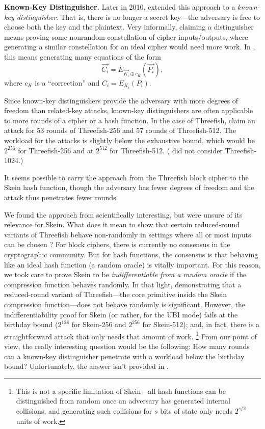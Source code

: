\documentclass[11pt,twoside]{article}
\begin{document}
\medskip

{\bf Known-Key Distinguisher.}
Later in 2010, \cite{RKN10} extended this approach to a \emph{known-key
  distinguisher}. That is, there is no longer a secret key---the adversary is free
to choose both the key and the plaintext. Very informally, claiming a 
distinguisher means proving some nonrandom constellation of cipher
inputs/outputs, where generating a similar constellation for an ideal cipher
would need more work. In \cite{RKN10}, this means 
generating many equations of the form
  \[ \vec{C_i}  =  E_{\vec{K_i}\oplus c_K}(\vec{P_i}), \]
where $c_K$ is a ``correction'' and $C_i =E_{K_i}(P_i)$. 

Since known-key distinguishers provide the adversary with more degrees of 
freedom than related-key attacks, known-key distinguishers are often 
applicable to more rounds of a cipher or a hash function. In
the case of Threefish, \cite{RKN10} claim an attack for 53 rounds of
Threefish-256 and 57 rounds of Threefish-512. The workload for the attacks
is slightly below the exhaustive bound, which would be $2^{256}$ for
Threefish-256 and at $2^{512}$ for Threefish-512. (\cite{RKN10} did not
consider Threefish-1024.)

It seems possible to carry the approach from the Threefish block cipher to the
Skein hash function, though the adversary has fewer degrees of freedom and the
attack thus penetrates fewer rounds. 

We found the approach from \cite{RKN10} scientifically interesting, but were unsure of its relevance for Skein. What does it mean to show that certain
reduced-round variants of Threefish behave non-randomly in settings where all
or most inputs can be chosen \cite{RKN10}? For block ciphers, there is
currently no consensus in the cryptographic community. But for hash functions,
the consensus is that  behaving like an ideal hash function (a random
oracle) is vitally important. For this reason, 
we took care to prove Skein to be \emph{indifferentiable from a random
  oracle} if the compression function behaves randomly. In that light,
demonstrating that a reduced-round variant of Threefish---the core primitive
inside the Skein compression function---does not behave randomly is 
significant. However, the
indifferentiability proof for Skein (or rather, for the UBI mode) fails at the
birthday bound ($2^{128}$ for Skein-256 and $2^{256}$ for Skein-512); and, in
fact, there is a straightforward attack that only needs that amount of work.%
\footnote{%
  This is not a specific limitation of Skein---all hash functions 
  can be distinguished from random once an adversary has generated internal
  collisions, and generating such collisions for $s$ bits of state only needs 
  $2^{s/2}$ units of work.}
From our point of view, the really interesting question would be the
following: 
How many rounds can a known-key
  distinguisher penetrate with a workload below the birthday bound?
Unfortunately, the answer isn't provided in \cite{RKN10}.
\end{document}
